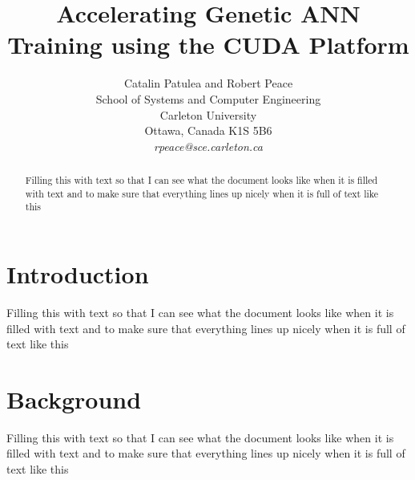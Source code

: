 \documentclass[11pt]{article}       %
\begin{document}


\title{Accelerating Genetic ANN Training using the CUDA Platform}


\author{
Catalin Patulea and Robert Peace\\
School of Systems and Computer Engineering\\
Carleton University\\
Ottawa, Canada K1S 5B6\\
{\em rpeace@sce.carleton.ca}
} %

\maketitle

\begin{abstract}
Filling this with text so that I can see what the document looks like when it is filled with text and to make sure that everything lines up nicely when it is full of text like this
\end{abstract}

\section{Introduction} \label{intro}
Filling this with text so that I can see what the document looks like when it is filled with text and to make sure that everything lines up nicely when it is full of text like this

\section{Background} \label{background}
Filling this with text so that I can see what the document looks like when it is filled with text and to make sure that everything lines up nicely when it is full of text like this
\end{document}

